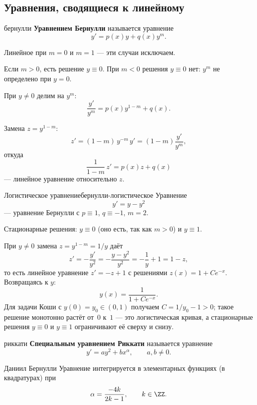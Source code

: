 \subsection{Уравнения, сводящиеся к линейному}

\begin{Definition}{}{бернулли}
	\textbf{Уравнением Бернулли} называется уравнение
	\[
	y' = p(x)y + q(x)y^{m}.
	\]
\end{Definition}

Линейное при $m = 0$ и $m = 1$ --- эти случаи исключаем.

Если $m > 0$, есть решение $y \equiv 0$. При $m < 0$ решения $y \equiv 0$ нет:
$y^{m}$ не определено при $y = 0$.

При $y \neq 0$ делим на $y^{m}$:
\[
\frac{y'}{y^{m}} = p(x)y^{1-m} + q(x).
\]

Замена $z = y^{1-m}$:
\[
z' = (1-m)\,y^{-m}\,y' = (1-m)\frac{y'}{y^{m}},
\]
откуда
\[
\frac{1}{1-m}\,z' = p(x)z + q(x)
\]
--- линейное уравнение относительно $z$.

\begin{Example}[addon]{Логистическое уравнение}{бернулли-логистическое}
	Уравнение
	\[
	y' = y - y^{2}
	\]
	--- уравнение Бернулли с $p \equiv 1$, $q \equiv -1$, $m = 2$.

	\medskip
	Стационарные решения: $y \equiv 0$ (оно есть, так как $m > 0$) и
	$y \equiv 1$.

	\medskip
	При $y \neq 0$ замена $z = y^{1-m} = 1/y$ даёт
	\[
	z' = -\frac{y'}{y^{2}} = -\frac{y - y^{2}}{y^{2}}
	= -\frac{1}{y} + 1 = 1 - z,
	\]
	то есть линейное уравнение $z' = -z + 1$ с решениями
	$z(x) = 1 + Ce^{-x}$. Возвращаясь к $y$:
	\[
	y(x) = \frac{1}{1 + Ce^{-x}}.
	\]
	Для задачи Коши с $y(0) = y_0 \in (0,1)$ получаем $C = 1/y_0 - 1 > 0$;
	такое решение монотонно растёт от~$0$ к~$1$ --- это логистическая кривая,
	а стационарные решения $y \equiv 0$ и $y \equiv 1$ ограничивают её сверху
	и снизу.
\end{Example}

\begin{Definition}{}{риккати}
	\textbf{Специальным уравнением Риккати} называется уравнение
	\[
	y' = ay^{2} + bx^{\alpha}, \qquad a,b \neq 0.
	\]
\end{Definition}

\begin{Remark}{Даниил Бернулли}{}
	Уравнение интегрируется в элементарных функциях (в квадратурах) при
	\[
	\alpha = \frac{-4k}{2k-1}, \qquad k \in \ZZ.
	\]
\end{Remark}

